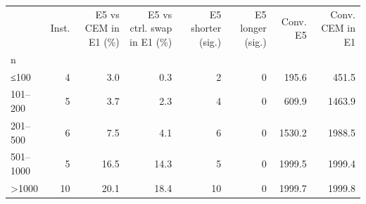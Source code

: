 \begin{tabular}{lrrrrrrr}
\toprule
 & Inst. & E5 vs CEM in E1 (\%) & E5 vs ctrl. swap in E1 (\%) & E5 shorter (sig.) & E5 longer (sig.) & Conv. E5 & Conv. CEM in E1 \\
n &  &  &  &  &  &  &  \\
\midrule
≤100 & 4 & 3.0 & 0.3 & 2 & 0 & 195.6 & 451.5 \\
101–200 & 5 & 3.7 & 2.3 & 4 & 0 & 609.9 & 1463.9 \\
201–500 & 6 & 7.5 & 4.1 & 6 & 0 & 1530.2 & 1988.5 \\
501–1000 & 5 & 16.5 & 14.3 & 5 & 0 & 1999.5 & 1999.4 \\
>1000 & 10 & 20.1 & 18.4 & 10 & 0 & 1999.7 & 1999.8 \\
\bottomrule
\end{tabular}
